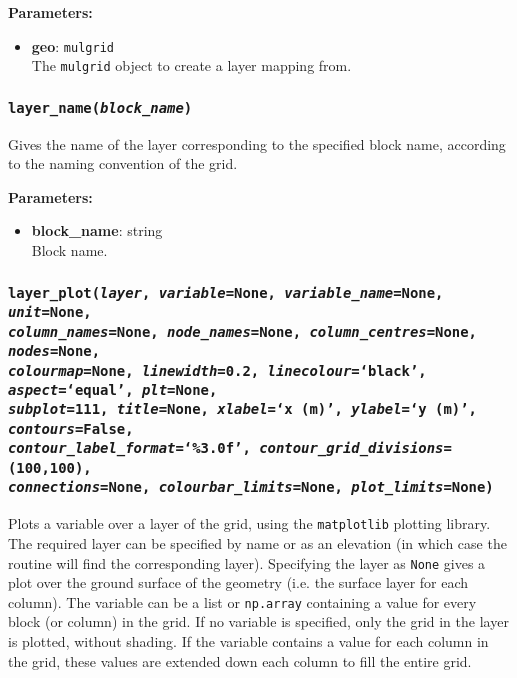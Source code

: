 \textbf{Parameters:}
\begin{itemize}
\item \textbf{geo}: \texttt{mulgrid}\\
  The \texttt{mulgrid} object to create a layer mapping from.
\end{itemize}

\subsubsection{\texttt{layer\_name(\emph{block\_name})}}

Gives the name of the layer corresponding to the specified block name, according to the naming convention of the grid.

\textbf{Parameters:}
\begin{itemize}
\item \textbf{block\_name}: string\\
  Block name.
\end{itemize}

\subsubsection{\texttt{layer\_plot(\emph{layer}, \emph{variable}=None, \emph{variable\_name}=None, \emph{unit}=None,\\
    \emph{column\_names}=None, \emph{node\_names}=None, \emph{column\_centres}=None, \emph{nodes}=None,\\
    \emph{colourmap}=None, \emph{linewidth}=0.2, \emph{linecolour}=`black', \emph{aspect}=`equal', \emph{plt}=None,\\
    \emph{subplot}=111, \emph{title}=None, \emph{xlabel}=`x (m)', \emph{ylabel}=`y (m)', \emph{contours}=False,\\
    \emph{contour\_label\_format}=`\%3.0f', \emph{contour\_grid\_divisions}=(100,100),\\
    \emph{connections}=None, \emph{colourbar\_limits}=None, \emph{plot\_limits}=None)}}

Plots a variable over a layer of the grid, using the \texttt{matplotlib} plotting library.  The required layer can be specified by name or as an elevation (in which case the routine will find the corresponding layer).  Specifying the layer as \texttt{None} gives a plot over the ground surface of the geometry (i.e. the surface layer for each column).  The variable can be a list or \texttt{np.array} containing a value for every block (or column) in the grid.  If no variable is specified, only the grid in the layer is plotted, without shading.  If the variable contains a value for each column in the grid, these values are extended down each column to fill the entire grid.

